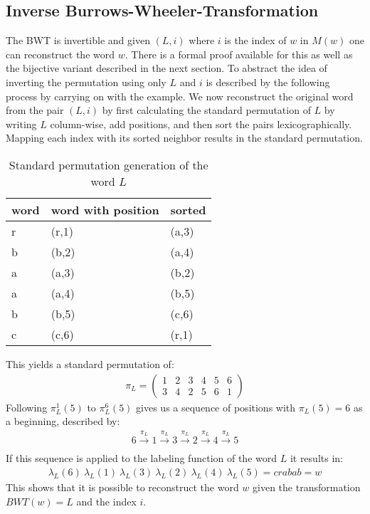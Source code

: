 \subsection{Inverse Burrows-Wheeler-Transformation}
\label{ch:Principles of compression:sec:Other:subSec:bwtInverse}
\par{
 The BWT is invertible and given $(L, i)$ where $i$ is the index of $w$ in $M(w)$ one can reconstruct the word $w$. There is a formal proof \cite{kufleitner2009bijective} available for this as well as the bijective variant described in the next section. To abstract the idea of inverting the permutation using only $L$ and $i$ is described by the following process by carrying on with the example. We now reconstruct the original word from the pair $(L,i)$ by first calculating the standard permutation of $L$ by writing $L$ column-wise, add positions, and then sort the pairs lexicographically. Mapping each index with its sorted neighbor results in the standard permutation.  
 \begin{table}[h]
 	\centering
 	\begin{tabular}{l|l|l}
		word & word with position & sorted\\
		\hline
		r & (r,1) & (a,3) \\
		b & (b,2) & (a,4) \\
		a & (a,3) & (b,2) \\
		a & (a,4) & (b,5) \\
		b & (b,5) & (c,6) \\
		c & (c,6) & (r,1)
 		\label{tab:t11 standard permutation}
 	\end{tabular}
 	\caption{Standard permutation generation of the word $L$}
 \end{table}
}
\par{
This yields a standard permutation of:
\begin{gather}  
\pi_L = 
\begin{pmatrix} 1 & 2 & 3 & 4 & 5 & 6\\ 3 & 4 & 2 & 5 & 6 & 1 \end{pmatrix}
\end{gather}
Following $\pi^1_L(5)$ to $\pi^6_L(5)$ gives us a sequence of positions with $\pi_L(5)=6$ as a beginning, described by:
\begin{gather} 
6 \xrightarrow[]{\pi_L} 1 \xrightarrow[]{\pi_L} 3 \xrightarrow[]{\pi_L} 2 \xrightarrow[]{\pi_L} 4 \xrightarrow[]{\pi_L} 5
\end{gather}
If this sequence is applied to the labeling function of the word $L$ it results in: 
\begin{gather}  
\lambda_L(6) \: \lambda_L(1) \: \lambda_L(3) \: \lambda_L(2) \: \lambda_L(4) \: \lambda_L(5)
= crabab = w
\end{gather}
This shows that it is possible to reconstruct the word $w$ given the transformation $BWT(w)=L$ and the index $i$.
}

